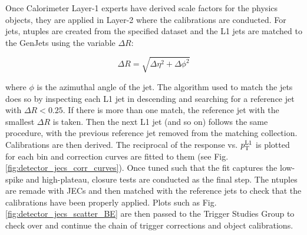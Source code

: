Once Calorimeter Layer-1 experts have derived scale factors for the physics objects, they are applied in Layer-2 where the calibrations are conducted. For jets, ntuples are created from the specified dataset and the L1 jets are matched to the GenJets using the variable $\Delta R$: 

\begin{equation}
\Delta R = \sqrt{\Delta \eta^2 + \Delta \phi^2}
\label{eq:delta_r}
\end{equation}

where $\phi$ is the azimuthal angle of the jet. The algorithm used to match the jets does so by inspecting each L1 jet in descending \pt and searching for a reference jet with $\Delta R < 0.25$. If there is more than one match, the reference jet with the smallest $\Delta R$ is taken. Then the next L1 jet (and so on) follows the same procedure, with the previous reference jet removed from the matching collection. Calibrations are then derived. The reciprocal of the response vs. $p_{\mathrm{T}}^{{\mathrm{L1}}}$ is plotted for each \abseta bin and correction curves are fitted to them (see Fig. \ref{fig:detector_jecs_corr_curves}). Once tuned such that the fit captures the low-\pt spike and high-\pt plateau, closure tests are conducted as the final step. The ntuples are remade with JECs and then matched with the reference jets to check that the calibrations have been properly applied. Plots such as Fig. \ref{fig:detector_jecs_scatter_BE} are then passed to the Trigger Studies Group to check over and continue the chain of trigger corrections and object calibrations.

